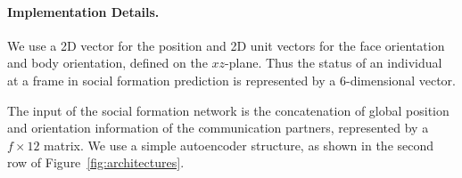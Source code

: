 \paragraph{Implementation Details.}
We use a 2D vector for the position and 2D unit vectors for the face orientation and body orientation, defined on the $xz$-plane. Thus the status of an individual at a frame in social formation prediction is represented by a 6-dimensional vector.


The input of the social formation network is the concatenation of global position and orientation information of the communication partners, represented by a $f \times 12$ matrix.  We use a simple autoencoder structure, as shown in the second row of Figure~\ref{fig:architectures}.


